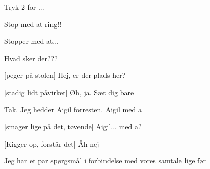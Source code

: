\documentclass[a4paper,11pt]{article}
\begin{document}
\begin{sketch}
 Tryk 2 for ...

 Stop med at ring!!

 Stopper med at...


 Hvad sker der???


[peger på stolen] Hej, er der plads her?

[stadig lidt påvirket] Øh, ja. Sæt dig bare

Tak. Jeg hedder Aigil forresten. Aigil med a

[smager lige på det, tøvende] Aigil... med a?

[Kigger op, forstår det] Åh nej

 Jeg har et par spørgsmål i forbindelse med vores samtale lige før



\end{sketch}
\end{document}

